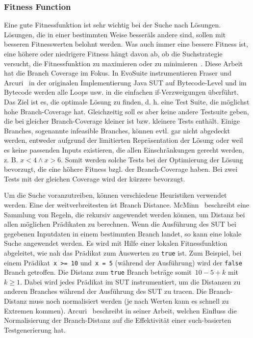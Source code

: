 \documentclass{article}
\begin{document}
\subsubsection{Fitness Function}
Eine gute Fitnessfunktion ist sehr wichtig bei der Suche nach Lösungen. Lösungen, die in einer bestimmten Weise \"besser\" als andere sind, sollen mit besseren Fitnesswerten belohnt werden. Was auch immer eine bessere Fitness ist, eine höhere oder niedrigere Fitness hängt davon ab, ob die Suchstrategie versucht, die Fitnessfunktion zu maximieren oder zu minimieren~\cite{McMinn_2004}. Diese Arbeit hat die Branch Coverage im Fokus. In EvoSuite instrumentieren Fraser und Arcuri~\cite{Fraser_2013} in der originalen Implementierung Java \ac{SUT} auf Bytecode-Level und im Bytecode werden alle Loops usw. in die einfachen if-Verzweigungen überführt. Das Ziel ist es, die optimale Lösung zu finden, d. h. eine Test Suite, die möglichst hohe Branch-Coverage hat. Gleichzeitig soll es aber keine andere Testsuite geben, die bei gleicher Branch-Coverage kleiner ist bzw. kleinere Tests enthält. Einige Branches, sogenannte infeasible Branches, können evtl. gar nicht abgedeckt werden, entweder aufgrund der limitierten Repräsentation der Lösung oder weil es keine passenden Inputs existieren, die allen Einschränkungen gerecht werden, z. B. $x < 4 \wedge x > 6$. Somit werden solche Tests bei der Optimierung der Lösung bevorzugt, die eine höhere Fitness bzgl. der Branch-Coverage haben. Bei zwei Tests mit der gleichen Coverage wird der kürzere bevorzugt. 

Um die Suche voranzutreiben, können verschiedene Heuristiken verwendet werden.  Eine der weitverbreitesten ist Branch Distance. McMinn~\cite{McMinn_2004} beschreibt eine Sammlung von Regeln, die rekursiv angewendet werden können, um Distanz bei allen möglichen Prädikaten zu berechnen. Wenn die Ausführung des \ac{SUT} bei gegebenen Inputdaten in einem bestimmten Branch landet, so kann eine lokale Suche angewendet werden. Es wird mit Hilfe einer lokalen Fitnessfunktion abgeleitet, wie nah das Prädikat zum Auswerten zu \lstinline{true} ist. Zum Beispiel, bei einem Prädikat~\lstinline{x >= 10} und~\lstinline{x = 5} (während der Ausführung) wird der \lstinline{false} Branch getroffen. Die Distanz zum \lstinline{true} Branch beträge somit~$10 - 5 + k$ mit~$k \geq 1$. Dabei wird jedes Prädikat im \ac{SUT} instrumentiert, um die Distanzen zu anderen Branches während der Ausführung des \ac{SUT} zu tracen. Die Branch-Distanz muss noch normalisiert werden (je nach Werten kann es schnell zu Extremen kommen). Arcuri~\cite{Arcuri_2011} beschreibt in seiner Arbeit, welchen Einfluss die Normalisierung der Branch-Distanz auf die Effektivität einer such-basierten Testgenerierung hat. 
\end{document}
